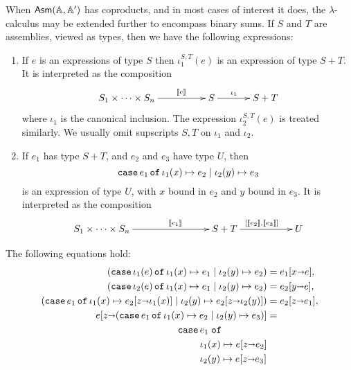 When $\mathsf{Asm}(\mathbb{A},\mathbb{A}')$ has coproducts, and in most cases of interest it does,
the $\lambda$-calculus may be extended further to encompass binary
sums. If $S$ and $T$ are assemblies, viewed as types, then
we have the following expressions:
%
\begin{enumerate}
\item If $e$ is an expressions of type $S$ then
  $\iota_1^{S,T}(e)$ is an expression of type $S +
  T$. It is interpreted as the composition
  \begin{equation*}
    \xymatrix{
      **[l]{S_1 \times \cdots \times S_n}
      \ar[r]^{\sem{e}}
      &
      {S}
      \ar[r]^{\iota_1}
      &
     **[r]{S + T}
    }
  \end{equation*}
  where $\iota_1$ is the canonical inclusion. The expression
  $\iota_2^{S,T}(e)$ is treated similarly. We usually omit
  supscripts $S, T$ on $\iota_1$ and $\iota_2$.
\item If $e_1$ has type $S + T$, and $e_2$ and $e_3$ have
  type $U$, then
  \begin{equation*}
    \mathtt{case}\,e_1\,\mathtt{of}\,\iota_1(x) \mapsto e_2 \mid \iota_2(y) \mapsto e_3
  \end{equation*}
  is an expression of type $U$, with $x$ bound in $e_2$ and
  $y$ bound in $e_3$. It is interpreted as the composition
  \begin{equation*}
    \xymatrix@+3em{
      **[l]{S_1 \times \cdots \times S_n}
      \ar[r]^{\sem{e_1}}
      &
      {S + T}
      \ar[r]^{[\sem{e_2}, \sem{e_3}]}
      &
      {U}
    }
  \end{equation*}
\end{enumerate}
%
The following equations hold:
%
\begin{align*}
  (\mathtt{case}\,\iota_1(e)\,\mathtt{of}\,\iota_1(x) \mapsto e_1 \mid \iota_2(y) \mapsto e_2) &=
  e_1[x {\shortrightarrow} e], \\
  (\mathtt{case}\,\iota_2(e)\,\mathtt{of}\,\iota_1(x) \mapsto e_1 \mid \iota_2(y) \mapsto e_2) &=
  e_2[y {\shortrightarrow} e], \\
  (\mathtt{case}\,e_1\,\mathtt{of}\,\iota_1(x) \mapsto e_2[z {\shortrightarrow} \iota_1(x)] \mid \iota_2(y) \mapsto e_2[z {\shortrightarrow} \iota_2(y)]
  ) &= e_2[z {\shortrightarrow} e_1], \\
  e[z {\shortrightarrow} (\mathtt{case}\,e_1\,\mathtt{of}\,\iota_1(x) \mapsto e_2 \mid \iota_2(y) \mapsto e_3)] &= \\
  \qquad
  \begin{aligned}[t]\mathtt{case}\,&e_1\;\mathtt{of}\\&\iota_1(x) \mapsto e[z {\shortrightarrow} e_2] \\&\iota_2(y) \mapsto e[z {\shortrightarrow} e_3]\end{aligned}
\end{align*}

